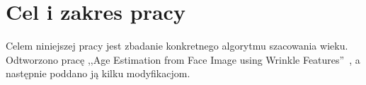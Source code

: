 \documentclass[a4paper,twoside,12pt]{book}
\begin{document}
    \section*{Cel i zakres pracy}\label{sec:cel-i-zakres-pracy}
    Celem niniejszej pracy jest zbadanie konkretnego algorytmu szacowania wieku.
    Odtworzono pracę ,,Age Estimation from Face Image using Wrinkle Features''~\cite{wrinkleFeatures}, a następnie poddano ją kilku
    modyfikacjom.
\end{document}

